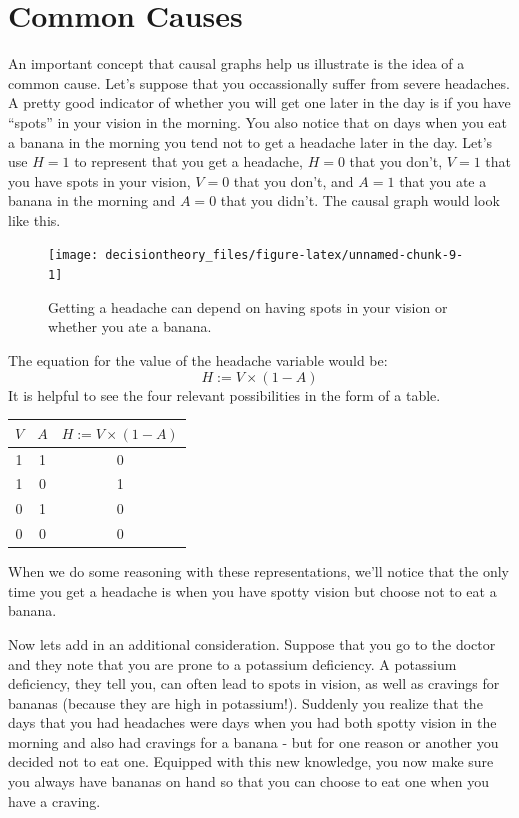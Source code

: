 \documentclass[]{tufte-book}
\begin{document}
\hypertarget{common-causes}{%
\section{Common Causes}\label{common-causes}}

An important concept that causal graphs help us illustrate is the idea of a common cause. Let's suppose that you occassionally suffer from severe headaches. A pretty good indicator of whether you will get one later in the day is if you have ``spots'' in your vision in the morning. You also notice that on days when you eat a banana in the morning you tend not to get a headache later in the day. Let's use \(H=1\) to represent that you get a headache, \(H=0\) that you don't, \(V=1\) that you have spots in your vision, \(V=0\) that you don't, and \(A=1\) that you ate a banana in the morning and \(A=0\) that you didn't. The causal graph would look like this.

\begin{figure}
\texttt{[image: decisiontheory\_files/figure-latex/unnamed-chunk-9-1]} \caption[Getting a headache can depend on having spots in your vision or whether you ate a banana]{Getting a headache can depend on having spots in your vision or whether you ate a banana.}\label{fig:unnamed-chunk-9}
\end{figure}

The equation for the value of the headache variable would be:
\[
H:= V\times (1 - A)
\]
It is helpful to see the four relevant possibilities in the form of a table.

\begin{longtable}[]{@{}ccc@{}}
\toprule
\(V\) & \(A\) & \(H:= V\times (1 - A)\)\tabularnewline
\midrule
\endhead
1 & 1 & 0\tabularnewline
1 & 0 & 1\tabularnewline
0 & 1 & 0\tabularnewline
0 & 0 & 0\tabularnewline
\bottomrule
\end{longtable}

When we do some reasoning with these representations, we'll notice that the only time you get a headache is when you have spotty vision but choose not to eat a banana.

Now lets add in an additional consideration. Suppose that you go to the doctor and they note that you are prone to a potassium deficiency. A potassium deficiency, they tell you, can often lead to spots in vision, as well as cravings for bananas (because they are high in potassium!). Suddenly you realize that the days that you had headaches were days when you had both spotty vision in the morning and also had cravings for a banana - but for one reason or another you decided not to eat one. Equipped with this new knowledge, you now make sure you always have bananas on hand so that you can choose to eat one when you have a craving.
\end{document}

